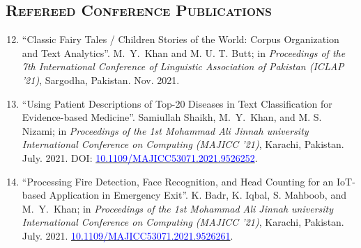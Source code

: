 \documentclass[a4paper, 10pt]{article}
\begin{document}
\subsection*{\normalfont\textsc{Refereed Conference Publications}}
\begin{enumerate}
\setcounter{enumi}{11}
\itemsep-4pt 






\item ``Classic Fairy Tales / Children Stories of the World: Corpus Organization and Text Analytics''. \textcolor{NavyBlue}{M.~Y.~Khan} and M. U. T. Butt;  in \emph{Proceedings of the 7th International Conference of Linguistic Association of Pakistan (ICLAP '21)}, Sargodha, Pakistan. Nov. 2021. %


\item ``Using Patient Descriptions of Top-20 Diseases in Text Classification for Evidence-based Medicine''. Samiullah Shaikh,  \textcolor{NavyBlue}{M.~Y.~Khan}, and M. S. Nizami;  in \emph{Proceedings of the 1st Mohammad Ali Jinnah university International Conference on Computing (MAJICC '21)}, Karachi, Pakistan. July. 2021. DOI: \href{https://ieeexplore.ieee.org/document/9526252}{\textcolor{blue}{10.1109/MAJICC53071.2021.9526252}}.

\item ``Processing Fire Detection, Face Recognition, and Head Counting for an IoT-based Application in Emergency Exit''. K. Badr, K. Iqbal, S. Mahboob, and  \textcolor{NavyBlue}{M.~Y.~Khan};  in \emph{Proceedings of the 1st Mohammad Ali Jinnah university International Conference on Computing (MAJICC '21)}, Karachi, Pakistan. July. 2021.  \href{https://ieeexplore.ieee.org/document/9526261}{\textcolor{blue}{10.1109/MAJICC53071.2021.9526261}}.


\end{enumerate}
\end{document}
